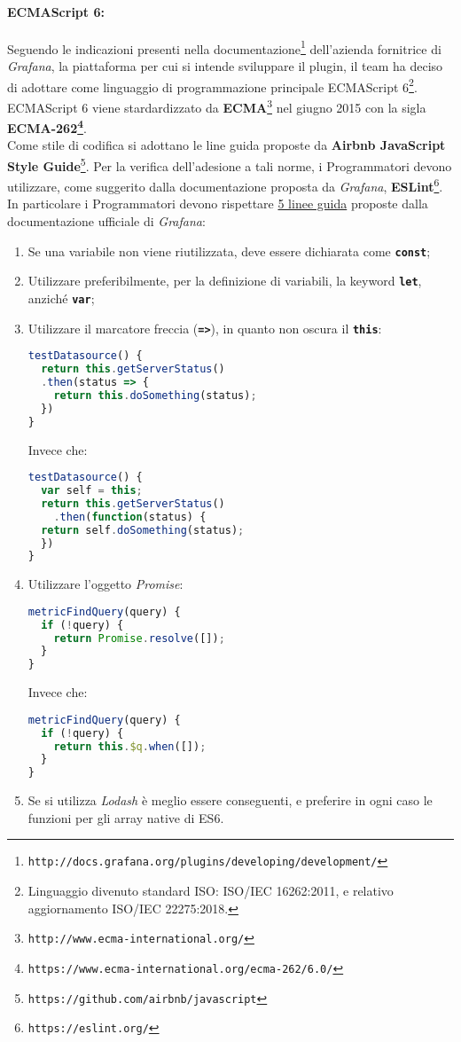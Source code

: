\paragraph{ECMAScript 6:}
Seguendo le indicazioni presenti nella documentazione\footnote{\texttt{http://docs.grafana.org/plugins/developing/development/}} dell'azienda fornitrice di \textit{Grafana}, la piattaforma  per cui si intende sviluppare il plugin, il team ha deciso di adottare come linguaggio di programmazione principale ECMAScript 6\footnote{Linguaggio divenuto standard ISO: ISO/IEC 16262:2011, e relativo aggiornamento ISO/IEC 22275:2018.}.\\
ECMAScript 6 viene stardardizzato da \textbf{ECMA}\glossario\footnote{\texttt{http://www.ecma-international.org/}} nel giugno 2015 con la sigla \textbf{ECMA-262\footnote{\texttt{https://www.ecma-international.org/ecma-262/6.0/}}}.\\
Come stile di codifica si adottano le line guida proposte da \textbf{Airbnb JavaScript Style Guide}\footnote{\texttt{https://github.com/airbnb/javascript}}. Per la verifica dell'adesione a tali norme, i Programmatori devono utilizzare, come suggerito dalla documentazione proposta da \textit{Grafana}, \textbf{ESLint}\glossario\footnote{\texttt{https://eslint.org/}}.\\
In particolare i Programmatori devono rispettare \underline{5 linee guida} proposte dalla documentazione ufficiale di \textit{Grafana}:
\begin{enumerate}
	\item Se una variabile non viene riutilizzata, deve essere dichiarata come \texttt{\textbf{const}};
	\item Utilizzare preferibilmente, per la definizione di variabili, la keyword  \texttt{\textbf{let}}, anziché  \texttt{\textbf{var}};
	\item Utilizzare il marcatore freccia (\texttt{\textbf{=>}}), in quanto non oscura il \texttt{\textbf{this}}:
	\begin{lstlisting}[language=JavaScript]
testDatasource() {
  return this.getServerStatus()
  .then(status => {
    return this.doSomething(status);
  })
}	
	\end{lstlisting}
	Invece che:
	\begin{lstlisting}[language=JavaScript]
testDatasource() {
  var self = this;
  return this.getServerStatus()
    .then(function(status) {
  return self.doSomething(status);
  })
}
	\end{lstlisting}
	\item Utilizzare l'oggetto \textit{Promise}:
	\begin{lstlisting}[language=JavaScript]
metricFindQuery(query) {
  if (!query) {
    return Promise.resolve([]);
  }
}	
	\end{lstlisting}
	Invece che:
	\begin{lstlisting}[language=JavaScript]
metricFindQuery(query) {
  if (!query) {
    return this.$q.when([]);
  }
}
	\end{lstlisting}
	\item Se si utilizza \textit{Lodash} è meglio essere conseguenti, e preferire in ogni caso le funzioni per gli array native di ES6.
\end{enumerate}
